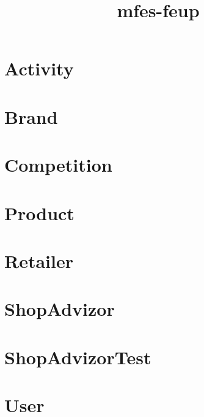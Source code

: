 \documentclass{article}
\begin{document}
\title{mfes-feup}
\author{}
\maketitle
\tableofcontents

\section{Activity}

\section{Brand}

\section{Competition}

\section{Product}

\section{Retailer}

\section{ShopAdvizor}

\section{ShopAdvizorTest}

\section{User}

\end{document}
